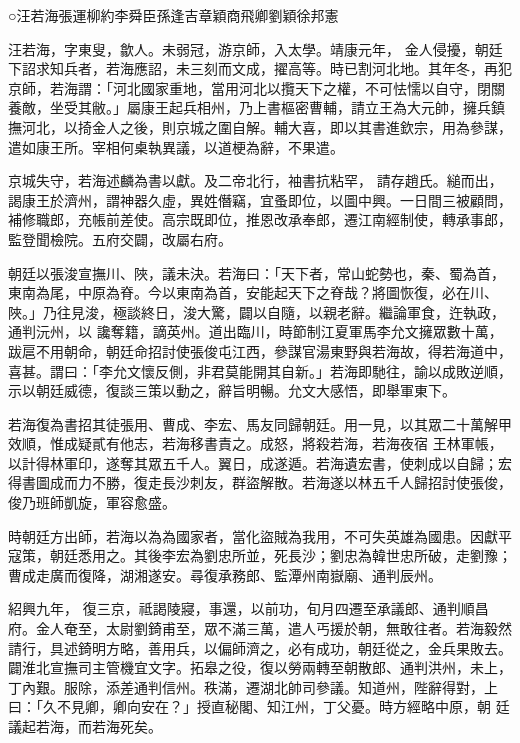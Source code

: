 
\begin{pinyinscope}

 ○汪若海張運柳約李舜臣孫逢吉章穎商飛卿劉穎徐邦憲



 汪若海，字東叟，歙人。未弱冠，游京師，入太學。靖康元年，
 金人侵擾，朝廷下詔求知兵者，若海應詔，未三刻而文成，擢高等。時已割河北地。其年冬，再犯京師，若海謂：「河北國家重地，當用河北以攬天下之權，不可怯懦以自守，閉關養敵，坐受其敝。」屬康王起兵相州，乃上書樞密曹輔，請立王為大元帥，擁兵鎮撫河北，以掎金人之後，則京城之圍自解。輔大喜，即以其書進欽宗，用為參謀，遣如康王所。宰相何㮚執異議，以道梗為辭，不果遣。



 京城失守，若海述麟為書以獻。及二帝北行，袖書抗粘罕，
 請存趙氏。縋而出，謁康王於濟州，謂神器久虛，異姓僭竊，宜蚤即位，以圖中興。一日間三被顧問，補修職郎，充帳前差使。高宗既即位，推恩改承奉郎，遷江南經制使，轉承事郎，監登聞檢院。五府交闢，改屬右府。



 朝廷以張浚宣撫川、陜，議未決。若海曰：「天下者，常山蛇勢也，秦、蜀為首，東南為尾，中原為脊。今以東南為首，安能起天下之脊哉？將圖恢復，必在川、陜。」乃往見浚，極談終日，浚大驚，闢以自隨，以親老辭。繼論軍食，迕執政，通判沅州，以
 讒奪籍，謫英州。道出臨川，時節制江夏軍馬李允文擁眾數十萬，跋扈不用朝命，朝廷命招討使張俊屯江西，參謀官湯東野與若海故，得若海道中，喜甚。謂曰：「李允文懷反側，非君莫能開其自新。」若海即馳往，諭以成敗逆順，示以朝廷威德，復談三策以動之，辭旨明暢。允文大感悟，即舉軍東下。



 若海復為書招其徒張用、曹成、李宏、馬友同歸朝廷。用一見，以其眾二十萬解甲效順，惟成疑貳有他志，若海移書責之。成怒，將殺若海，若海夜宿
 王林軍帳，以計得林軍印，遂奪其眾五千人。翼日，成遂遁。若海遺宏書，使刺成以自歸；宏得書圖成而力不勝，復走長沙刺友，群盜解散。若海遂以林五千人歸招討使張俊，俊乃班師凱旋，軍容愈盛。



 時朝廷方出師，若海以為為國家者，當化盜賊為我用，不可失英雄為國患。因獻平寇策，朝廷悉用之。其後李宏為劉忠所並，死長沙；劉忠為韓世忠所破，走劉豫；曹成走廣而復降，湖湘遂安。尋復承務郎、監潭州南嶽廟、通判辰州。



 紹興九年，
 復三京，祗謁陵寢，事還，以前功，旬月四遷至承議郎、通判順昌府。金人奄至，太尉劉錡甫至，眾不滿三萬，遣人丐援於朝，無敢往者。若海毅然請行，具述錡明方略，善用兵，以偏師濟之，必有成功，朝廷從之，金兵果敗去。闢淮北宣撫司主管機宜文字。拓皋之役，復以勞兩轉至朝散郎、通判洪州，未上，丁內艱。服除，添差通判信州。秩滿，遷湖北帥司參議。知道州，陛辭得對，上曰：「久不見卿，卿向安在？」授直秘閣、知江州，丁父憂。時方經略中原，朝
 廷議起若海，而若海死矣。




\end{pinyinscope}
